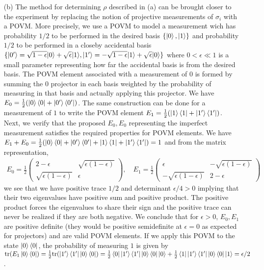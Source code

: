 \documentclass[10pt, a4paper]{article}
\begin{document}
{\begin{enumerate}
  \newpage
  \item[(b)] The method for determining $\rho$ described in (a) can be brought closer to the experiment by replacing the notion of projective measurements of $\sigma_i$ with a POVM. More precisely, we use a POVM to model a measurement wich has probability $1/2$ to be performed in the desired basis $\{\ket{0}, \ket{1}\}$ and probability $1/2$ to be performed in a closeby accidental basis $\{\ket{0'} = \sqrt{1-\epsilon}|0\rangle+\sqrt{\epsilon}|1\rangle, \ket{1'} = -\sqrt{1-\epsilon}|1\rangle+\sqrt{\epsilon}|0\rangle\}$ where $0 < \epsilon \ll 1$ is a small parameter representing how far the accidental basis is from the desired basis. The POVM element associated with a measurement of $0$ is formed by summing the $0$ projector in each basis weighted by the probability of measuring in that basis and actually applying this projector. We have $E_0 = \frac{1}{2}(\ket{0}\bra{0} + \ket{0'}\bra{0'})$. The same construction can be done for a measurement of $1$ to write the POVM element $E_1 = \frac{1}{2}(\ket{1}\bra{1} + \ket{1'}\bra{1'})$. Next, we verify that the proposed $E_0, E_0$ representing the imperfect measurement satisfies the required properties for POVM elements. We have $E_1 + E_0 = \frac{1}{2}(\ket{0}\bra{0} + \ket{0'}\bra{0'} + \ket{1}\bra{1} + \ket{1'}\bra{1'}) = 1$ and from the matrix representation, 
  \begin{align*}
    E_0 = \frac{1}{2}
    \begin{pmatrix}
      2 - \epsilon & \sqrt{\epsilon(1-\epsilon)}\\
      \sqrt{\epsilon(1-\epsilon)} & \epsilon
    \end{pmatrix},\quad  
     E_1 = \frac{1}{2}
    \begin{pmatrix}
      \epsilon & -\sqrt{\epsilon(1-\epsilon)}\\
      -\sqrt{\epsilon(1-\epsilon)} & 2-\epsilon
    \end{pmatrix}
  \end{align*}
  we see that we have positive trace $1/2$ and determinant $\epsilon/4 > 0$ implying that their two eigenvalues have positive sum and positive product. The positive product forces the eigenvalues to share their sign and the positive trace can never be realized if they are both negative. We conclude that for $\epsilon>0$, $E_0, E_1$ are positive definite (they would be positive semidefinite at $\epsilon = 0$ as expected for projectors) and are valid POVM elements. If we apply this POVM to the state $\ket{0}\bra{0}$, the probability of measuring $1$ is given by $\text{tr}(E_1 \ket{0}\bra{0}) = \frac{1}{2}\text{tr}(\ket{1'}\bra{1'} \ket{0}\bra{0}) = \frac{1}{2} \bra{0}\ket{1'}\bra{1'} \ket{0}\bra{0}\ket{0} + \frac{1}{2}\bra{1}\ket{1'}\bra{1'} \ket{0}\bra{0}\ket{1} = \epsilon/2$. 

\end{enumerate}}
\end{document}
